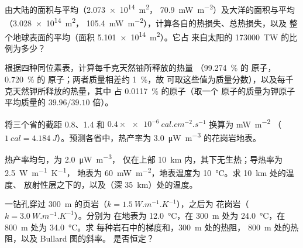 \begin{exercise}[$\star$]\label{exo:b1:heat-budget:2}
由大陆的面积与平均（\qty{2.073e14}{m^2}，
\qty{70.9}{mW.m^{-2}}）及大洋的面积与平均（\qty{3.028e14}{m^2}，
\qty{105.4}{mW.m^{-2}}），计算各自的热损失、总热损失，以及
整个地球表面的平均（面积 \qty{5.101e14}{m^2}）。它占
来自太阳的 \qty{173000}{TW} 的比例为多少？
\end{exercise}

\begin{exercise}[$\star$]\label{exo:b1:heat-budget:3}
根据四种同位素表，计算每千克天然铀所释放的热量
（\qty{99.274}{\percent} 的  原子，\qty{0.720}{\percent}
的  原子；两者质量相差约 \qty{1}{\percent}，故
可取这些值为质量分数），以及每千克天然钾所释放的热量，其中
 占 \qty{0.0117}{\percent} 的原子（取一个
 原子的质量为钾原子平均质量的 $39.96/39.10$ 倍）。
\end{exercise}

\begin{exercise}[$\star$]\label{exo:b1:heat-budget:4}
将三个省的截距 0.8、1.4 和
$0.4\times\qty{e-6}{cal.cm^{-2}.s^{-1}}$ 换算为 \unit{mW.m^{-2}}
（$\qty{1}{cal} = \qty{4.184}{J}$）。预测各省中，热产率为
\qty{3.0}{\micro W.m^{-3}} 的花岗岩地表。
\end{exercise}

\begin{exercise}[$\star\star$]\label{exo:b1:heat-budget:5}
热产率均匀，为 \qty{2.0}{\micro W.m^{-3}}，
仅在上部 \qty{10}{km} 内，其下无生热；导热率为 \qty{2.5}{W.m^{-1}.K^{-1}}，
地表为 \qty{60}{mW.m^{-2}}，地表温度为
\qty{10}{\degreeCelsius}。求 \qty{10}{km} 处的温度、
放射性层之下的，以及（深 \qty{35}{km}）处的温度。
\end{exercise}

\begin{exercise}[$\star\star$]\label{exo:b1:heat-budget:6}
一钻孔穿过 \qty{300}{m} 的页岩（$k = \qty{1.5}{W.m^{-1}.K^{-1}}$），之后为
花岗岩（$k = \qty{3.0}{W.m^{-1}.K^{-1}}$）。分别为
在地表为 \qty{12.0}{\degreeCelsius}，在
\qty{300}{m} 处为 \qty{24.0}{\degreeCelsius}，在 \qty{800}{m} 处为 \qty{34.0}{\degreeCelsius}。求
每种岩石中的梯度和，\qty{300}{m} 处的热阻，
\qty{800}{m} 处的热阻，以及 Bullard 图的斜率。
是否恒定？
\end{exercise}

